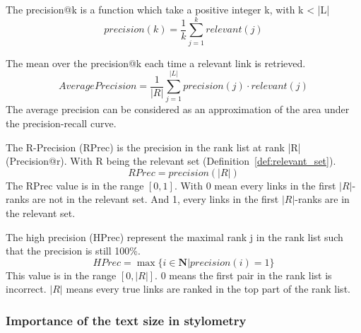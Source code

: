 \begin{definition}
  The precision@k is a function which take a positive integer k, with k < |L|
  \begin{equation}
    precision(k) = \frac{1}{k} \sum_{j=1}^{k} relevant(j)
  \end{equation}
\end{definition}

\begin{definition}
  The mean over the precision@k each time a relevant link is retrieved.
  \begin{equation}
    AveragePrecision = \frac{1}{|R|} \sum_{j=1}^{|L|} precision(j) \cdot relevant(j)
  \end{equation}
  The average precision can be considered as an approximation of the area under the precision-recall curve.
\end{definition}

\begin{definition}
  The R-Precision (RPrec) is the precision in the rank list at rank |R| (Precision@r).
  With R being the relevant set (Definition~\ref{def:relevant_set}).
  \begin{equation}
    RPrec = precision(|R|)
  \end{equation}
  The RPrec value is in the range $\left[0, 1\right]$.
  With 0 mean every links in the first $|R|$-ranks are not in the relevant set.
  And 1, every links in the first $|R|$-ranks are in the relevant set.
\end{definition}

\begin{definition}
  The high precision (HPrec) represent the maximal rank j in the rank list such that the precision is still 100\%.
  \begin{equation}
    HPrec = \max\{i \in \mathbf{N} | precision(i) = 1\}
  \end{equation}
  This value is in the range $\left[0, |R|\right]$.
  $0$ means the first pair in the rank list is incorrect.
  $|R|$ means every true links are ranked in the top part of the rank list.
\end{definition}

\subsubsection{Importance of the text size in stylometry}

